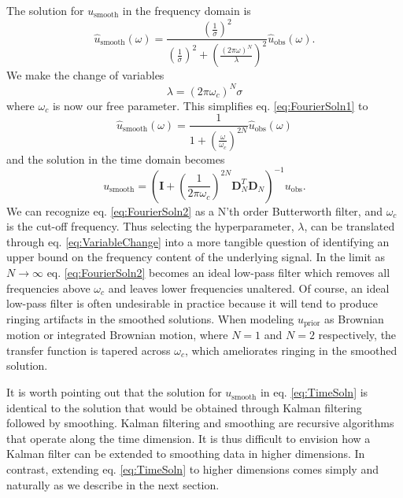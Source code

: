 \documentclass[10pt,a4paper]{article}
\begin{document}
The solution for $u_\mathrm{smooth}$ in the frequency domain is
\begin{equation}\label{eq:FourierSoln1}
\hat{u}_\mathrm{smooth}(\omega) = \frac{\left(\frac{1}{\sigma}\right)^2}
                                  {\left(\frac{1}{\sigma}\right)^2 + \left(\frac{(2\pi\omega)^N}{\lambda}\right)^2}
                                  \hat{u}_\mathrm{obs}(\omega).
\end{equation}
We make the change of variables
\begin{equation}\label{eq:VariableChange}
\lambda = (2\pi\omega_c)^N\sigma
\end{equation}
where $\omega_c$ is now our free parameter. This simplifies eq. \ref{eq:FourierSoln1} to
\begin{equation}\label{eq:FourierSoln2}
\hat{u}_\mathrm{smooth}(\omega) = \frac{1}
                                  {1 + \left(\frac{\omega}{\omega_c}\right)^{2N}}
                                  \hat{u}_\mathrm{obs}(\omega)                                  
\end{equation}
and the solution in the time domain becomes
\begin{equation}\label{eq:TimeSoln}
u_\mathrm{smooth} = \left(\mathbf{I} + 
                          \left(\frac{1}{2\pi\omega_c}\right)^{2N}
                          \mathbf{D}_N^T\mathbf{D}_N\right)^{-1} u_\mathrm{obs}.
\end{equation}
We can recognize eq. \ref{eq:FourierSoln2} as a N'th order Butterworth filter, and $\omega_c$ is the cut-off frequency.  Thus selecting the hyperparameter, $\lambda$, can be translated through eq. \ref{eq:VariableChange} into a more tangible question of identifying an upper bound on the frequency content of the underlying signal. In the limit as $N\to \infty$ eq. \ref{eq:FourierSoln2} becomes an ideal low-pass filter which removes all frequencies above $\omega_c$ and leaves lower frequencies unaltered.  Of course, an ideal low-pass filter is often undesirable in practice because it will tend to produce ringing artifacts in the smoothed solutions.  When modeling $u_\mathrm{prior}$ as Brownian motion or integrated Brownian motion, where $N=1$ and $N=2$ respectively, the transfer function is tapered across $\omega_c$, which ameliorates ringing in the smoothed solution.

It is worth pointing out that the solution for $u_\mathrm{smooth}$ in eq. \ref{eq:TimeSoln} is identical to the solution that would be obtained through Kalman filtering followed by smoothing. Kalman filtering and smoothing are recursive algorithms that operate along the time dimension.  It is thus difficult to envision how a Kalman filter can be extended to smoothing data in higher dimensions.  In contrast, extending eq. \ref{eq:TimeSoln} to higher dimensions comes simply and naturally as we describe in the next section.     
\end{document}
